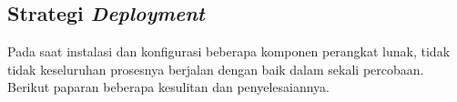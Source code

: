 \subsection{Strategi \textit{Deployment}}
Pada saat instalasi dan konfigurasi beberapa komponen perangkat lunak, tidak tidak keseluruhan prosesnya berjalan dengan baik dalam sekali percobaan. Berikut paparan beberapa kesulitan dan penyelesaiannya.
	  
	
%	
%	
%	
	
%	
%	
	
	
	
	
	 
  
  
  
  
  
  
